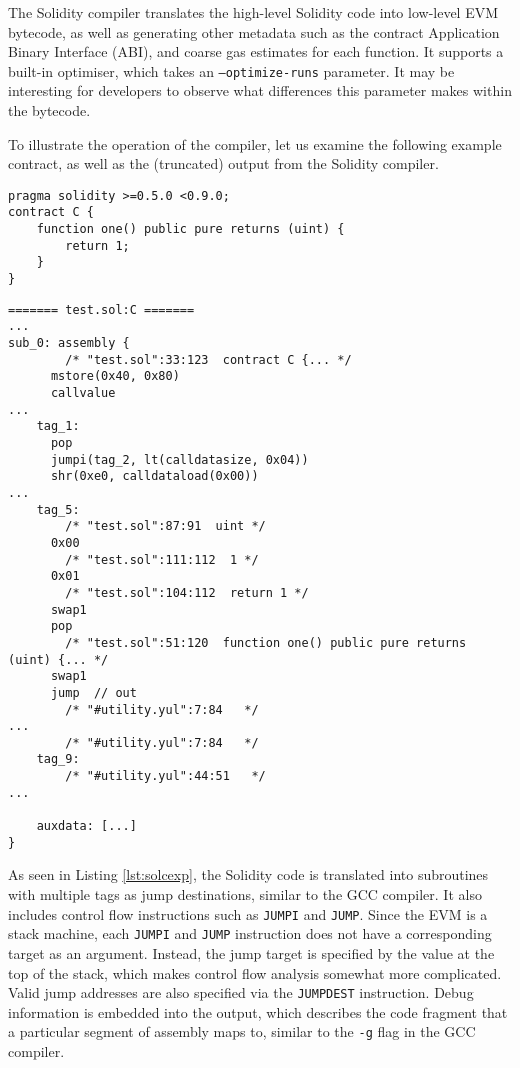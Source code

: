 The Solidity compiler translates the high-level Solidity code into low-level EVM bytecode,
as well as generating other metadata such as the contract Application Binary Interface (ABI),
and coarse gas estimates for each function. It supports a built-in optimiser, which
takes an \texttt{--optimize-runs} parameter. 
It may be interesting for developers to observe what differences this parameter makes within 
the bytecode.

To illustrate the operation of the compiler, let us examine the following example contract,
as well as the (truncated) output from the Solidity compiler.\\

\begin{lstlisting}[language=Solidity, caption={An example Solidity contract}, label={lst:solcsolidityexp}, basicstyle=\ttfamily\scriptsize]
pragma solidity >=0.5.0 <0.9.0;
contract C {
    function one() public pure returns (uint) {
        return 1;
    }
}
\end{lstlisting}

\begin{lstlisting}[language=plantuml, caption={EVM assembly from the Solidity compiler}, label={lst:solcexp}, basicstyle=\ttfamily\scriptsize]
======= test.sol:C =======
...
sub_0: assembly {
        /* "test.sol":33:123  contract C {... */
      mstore(0x40, 0x80)
      callvalue
...
    tag_1:
      pop
      jumpi(tag_2, lt(calldatasize, 0x04))
      shr(0xe0, calldataload(0x00))
...
    tag_5:
        /* "test.sol":87:91  uint */
      0x00
        /* "test.sol":111:112  1 */
      0x01
        /* "test.sol":104:112  return 1 */
      swap1
      pop
        /* "test.sol":51:120  function one() public pure returns (uint) {... */
      swap1
      jump	// out
        /* "#utility.yul":7:84   */
...
        /* "#utility.yul":7:84   */
    tag_9:
        /* "#utility.yul":44:51   */
...

    auxdata: [...]
}
\end{lstlisting}

As seen in Listing \ref{lst:solcexp}, the Solidity code is translated into subroutines with
multiple tags as jump destinations, similar to the GCC compiler. It also includes control flow
instructions such as \texttt{JUMPI} and \texttt{JUMP}. Since the EVM is a stack machine, each
\texttt{JUMPI} and \texttt{JUMP} instruction does not have a corresponding target as an argument.
Instead, the jump target is specified by the value at the top of the stack, which makes 
control flow analysis somewhat more complicated. Valid jump
addresses are also specified via the \texttt{JUMPDEST} instruction.
Debug information is
embedded into the output, which describes the code fragment that a particular segment of
assembly maps to, similar to the \texttt{-g} flag in the GCC compiler.

